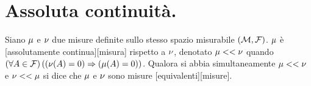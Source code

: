 \section{Assoluta continuit\`a.}
\label{Misura_AssolutaContinuita}
\begin{Definition}
  Siano $\mu$ e $\nu$ due misure definite sullo stesso spazio
  misurabile $(\mathcal{M},\mathcal{F})$.
  $\mu$ \`e
  [assolutamente continua][misura]
  rispetto a $\nu$, denotato
  $\mu << \nu$
  quando
  $\left ( \forall A \in \mathcal{F} \right ) \left ( 
    \left ( \nu(A) = 0 \right ) \Rightarrow \left ( \mu(A) = 0 \right ) \right )$.
  Qualora si abbia simultaneamente
  $\mu << \nu$
  e
  $\nu << \mu$
  si dice che
  $\mu$ e $\nu$ sono misure
  [equivalenti][misure].
\end{Definition}
